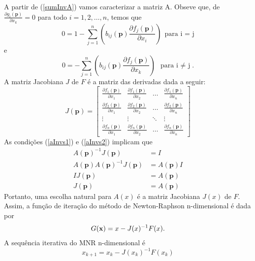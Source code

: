 A partir de (\ref{sumInvA}) vamos caracterizar a matriz A. Obseve que, de \( \frac{\partial g_i(\mathbf{p})}{\partial x_k} = 0 \) para todo $ i = 1,2, \ldots, n$, temos que
\begin{equation}\label{aInvs1}
    0 = 1 - \sum_{j=1}^{n} \left( b_{ij}(\mathbf{p}) \frac{\partial f_j(\mathbf{p})}{\partial x_i} \right) \ \ \text{para i = j}
\end{equation}
e
\begin{equation}\label{aInvs2}
    0 = - \sum_{j=1}^{n} \left( b_{ij}(\mathbf{p}) \frac{\partial f_j(\mathbf{p})}{\partial x_k} \right)\ \ \text{para i $\neq$ j}.
\end{equation}
A matriz Jacobiana \(J\) de \(F\) é a matriz das derivadas dada a seguir:
\begin{equation}
    J(\mathbf{p}) =
    \begin{bmatrix}
        \frac{\partial f_1(\mathbf{p})}{\partial x_1} & \frac{\partial f_1(\mathbf{p})}{\partial x_2} & \ldots & \frac{\partial f_1(\mathbf{p})}{\partial x_n} \\
        \frac{\partial f_2(\mathbf{p})}{\partial x_1} & \frac{\partial f_2(\mathbf{p})}{\partial x_2} & \ldots & \frac{\partial f_2(\mathbf{p})}{\partial x_n} \\
        \vdots & \vdots & \ddots & \vdots \\
        \frac{\partial f_n(\mathbf{p})}{\partial x_1} & \frac{\partial f_n(\mathbf{p})}{\partial x_2} & \ldots & \frac{\partial f_n(\mathbf{p})}{\partial x_n}
    \end{bmatrix}
\end{equation}
As condições (\ref{aInvs1}) e (\ref{aInvs2}) implicam que
\begin{align*}
    A(\mathbf{p})^{-1} J(\mathbf{p}) &= I \\[6pt]
    A(\mathbf{p}) A(\mathbf{p})^{-1} J(\mathbf{p}) &= A(\mathbf{p}) I \\[6pt]
    I J(\mathbf{p}) &= A(\mathbf{p}) \\[6pt]
    J(\mathbf{p}) &= A(\mathbf{p})
\end{align*}
Portanto, uma escolha natural para \(A(x)\) é a matriz Jacobiana \(J(x)\) de \(F\). Assim, a função de iteração do método de Newton-Raphson n-dimensional é dada por
\begin{equation}
    G(\textbf{x}) = x - J(x)^{-1} F(x).
\end{equation}
A sequência iterativa do MNR n-dimensional é
\begin{equation}\label{seqIterNRndim}
    x_{k+1} = x_k - J(x_k)^{-1} F(x_k)
\end{equation}
